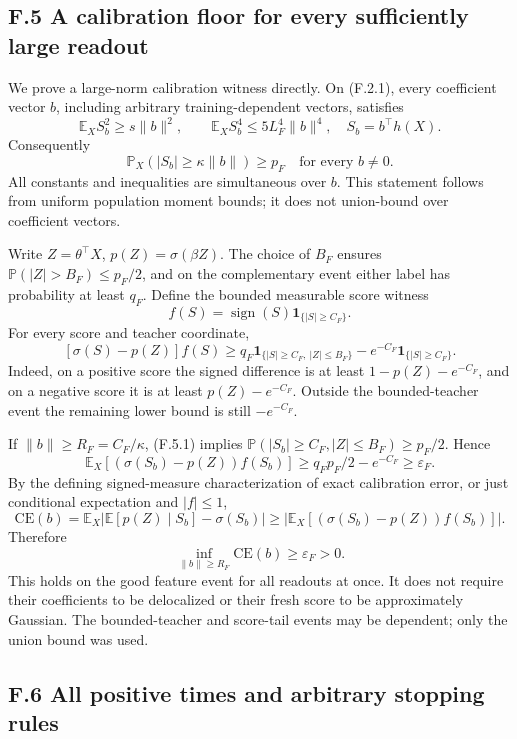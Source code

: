 \documentclass[
  11pt,
  a4paper,
]{article}
\begin{document}
\hypertarget{f.5-a-calibration-floor-for-every-sufficiently-large-readout}{%
\subsection{F.5 A calibration floor for every sufficiently large
readout}\label{f.5-a-calibration-floor-for-every-sufficiently-large-readout}}

We prove a large-norm calibration witness directly. On (F.2.1), every
coefficient vector \(b\), including arbitrary training-dependent
vectors, satisfies \[
\mathbb E_X S_b^2\ge s\|b\|^2,\qquad
\mathbb E_X S_b^4\le5L_F^4\|b\|^4,
\quad S_b=b^\top h(X).
\] Consequently \[
\mathbb P_X(|S_b|\ge\kappa\|b\|)\ge p_F
\quad\text{for every }b\ne0.
\tag{F.5.1}
\] All constants and inequalities are simultaneous over \(b\). This
statement follows from uniform population moment bounds; it does not
union-bound over coefficient vectors.

Write \(Z=\theta^\top X\), \(p(Z)=\sigma(\beta Z)\). The choice of
\(B_F\) ensures \(\mathbb P(|Z|>B_F)\le p_F/2\), and on the
complementary event either label has probability at least \(q_F\).
Define the bounded measurable score witness \[
f(S)=\operatorname{sign}(S)\mathbf1_{\{|S|\ge C_F\}}.
\] For every score and teacher coordinate, \[
[\sigma(S)-p(Z)]f(S)
\ge q_F\mathbf1_{\{|S|\ge C_F,\ |Z|\le B_F\}}
   -e^{-C_F}\mathbf1_{\{|S|\ge C_F\}}.
\tag{F.5.2}
\] Indeed, on a positive score the signed difference is at least
\(1-p(Z)-e^{-C_F}\), and on a negative score it is at least
\(p(Z)-e^{-C_F}\). Outside the bounded-teacher event the remaining lower
bound is still \(-e^{-C_F}\).

If \(\|b\|\ge R_F=C_F/\kappa\), (F.5.1) implies
\(\mathbb P(|S_b|\ge C_F,|Z|\le B_F)\ge p_F/2\). Hence \[
\mathbb E_X[(\sigma(S_b)-p(Z))f(S_b)]
\ge q_Fp_F/2-e^{-C_F}\ge\varepsilon_F.
\tag{F.5.3}
\] By the defining signed-measure characterization of exact calibration
error, or just conditional expectation and \(|f|\le1\), \[
\mathrm{CE}(b)
=\mathbb E_X\left|\mathbb E[p(Z)\mid S_b]-\sigma(S_b)\right|
\ge\left|\mathbb E_X[(\sigma(S_b)-p(Z))f(S_b)]\right|.
\] Therefore \[
\boxed{\qquad \inf_{\|b\|\ge R_F}\mathrm{CE}(b)\ge\varepsilon_F>0.\qquad}
\tag{F.5.4}
\] This holds on the good feature event for all readouts at once. It
does not require their coefficients to be delocalized or their fresh
score to be approximately Gaussian. The bounded-teacher and score-tail
events may be dependent; only the union bound was used.

\hypertarget{f.6-all-positive-times-and-arbitrary-stopping-rules}{%
\subsection{F.6 All positive times and arbitrary stopping
rules}\label{f.6-all-positive-times-and-arbitrary-stopping-rules}}
\end{document}

